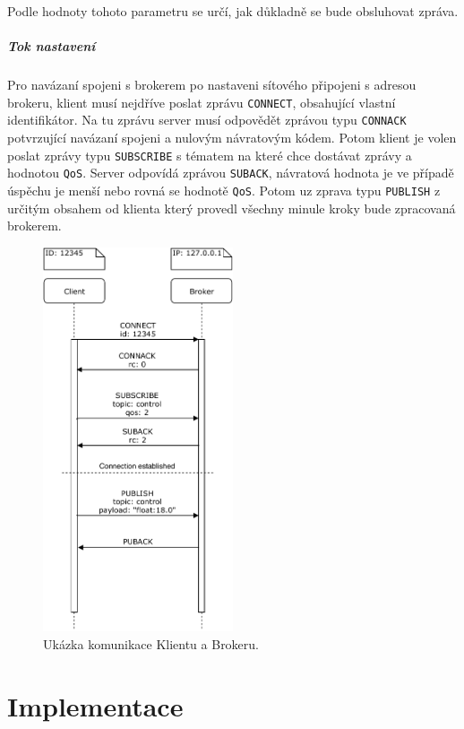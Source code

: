 Podle hodnoty tohoto parametru se určí, jak důkladně se bude obsluhovat zpráva.

\paragraph{Tok nastavení}

Pro navázaní spojeni s brokerem po nastaveni sítového připojeni s adresou brokeru, klient musí nejdříve poslat zprávu \texttt{CONNECT}, obsahující vlastní identifikátor. Na tu zprávu server musí odpovědět zprávou typu \texttt{CONNACK} potvrzující navázaní spojeni a nulovým návratovým kódem. Potom klient je volen poslat zprávy typu \texttt{SUBSCRIBE} s tématem na které chce dostávat zprávy a hodnotou \texttt{QoS}. Server odpovídá zprávou \texttt{SUBACK}, návratová hodnota je ve případě úspěchu je menší nebo rovná se hodnotě \texttt{QoS}. Potom uz zprava typu \texttt{PUBLISH} z určitým obsahem od klienta který provedl všechny minule kroky bude zpracovaná brokerem.

\begin{figure}[hbt]
  \centering
  \includegraphics[width=0.5\textwidth]{obrazky-figures/MQTT-flow.pdf}
  \caption{Ukázka komunikace Klientu a Brokeru.}
  \label{mqtt-flow}
\end{figure}

\chapter{Implementace}
\label{sec:implementation}

